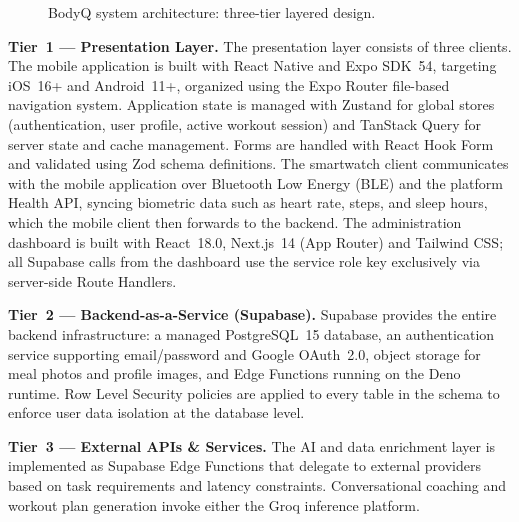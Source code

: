 \begin{figure}[H]
	\caption{BodyQ system architecture: three-tier layered design.}
	\label{fig:architecture}
\end{figure}


\textbf{Tier~1 --- Presentation Layer.}
The presentation layer consists of three clients. The mobile application is built with React Native and Expo SDK~54, targeting iOS~16+ and Android~11+, organized using the Expo Router file-based navigation system. Application state is managed with Zustand for global stores (authentication, user profile, active workout session) and TanStack Query for server state and cache management. Forms are handled with React Hook Form and validated using Zod schema definitions. The smartwatch client communicates with the mobile application over Bluetooth Low Energy (BLE) and the platform Health API, syncing biometric data such as heart rate, steps, and sleep hours, which the mobile client then forwards to the backend. The administration dashboard is built with React~18.0, Next.js~14 (App Router) and Tailwind CSS; all Supabase calls from the dashboard use the service role key exclusively via server-side Route Handlers.

\textbf{Tier~2 --- Backend-as-a-Service (Supabase).}
Supabase provides the entire backend infrastructure: a managed PostgreSQL~15 database, an authentication service supporting email/password and Google OAuth~2.0, object storage for meal photos and profile images, and Edge Functions running on the Deno runtime. Row Level Security policies are applied to every table in the schema to enforce user data isolation at the database level.

\textbf{Tier~3 --- External APIs \& Services.}
The AI and data enrichment layer is implemented as Supabase Edge Functions that delegate to external providers based on task requirements and latency constraints. Conversational coaching and workout plan generation invoke either the Groq inference platform.

